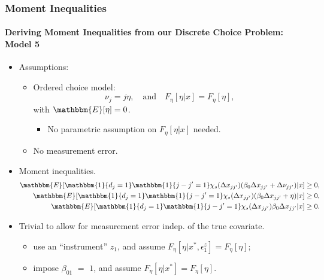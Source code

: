 \documentclass[10pt,letterpaper]{beamer}
\begin{document}
\begin{frame}
\frametitle{Moment Inequalities}
\framesubtitle{Deriving Moment Inequalities from our Discrete Choice Problem: Model 5}

\begin{itemize}
	\item Assumptions:
	\begin{itemize}
		\item Ordered choice model:
		\begin{equation*}
		\nu_{j} = j\eta,\quad\text{and}\quad F_{\eta}[\eta|x]=F_{\eta}[\eta],
		\end{equation*}
		with $\mathbbm{E}[\eta]=0$.
		\begin{itemize}
			\item No parametric assumption on $F_{\eta}[\eta|x]$ needed.
		\end{itemize}
		\item No measurement error.
	\end{itemize}
	\item Moment inequalities.
	\begin{align*}
	\mathbbm{E}[\mathbbm{1}\{d_{j}=1\}\mathbbm{1}\{j-j'=1\}\chi_{s}(\Delta x_{jj'})(\beta_{0}\Delta x_{jj'}+\Delta\nu_{jj'})|x]\geq 0,\\
	\mathbbm{E}[\mathbbm{1}\{d_{j}=1\}\mathbbm{1}\{j-j'=1\}\chi_{s}(\Delta x_{jj'})(\beta_{0}\Delta x_{jj'}+\eta)|x]\geq 0,\\
	\mathbbm{E}[\mathbbm{1}\{d_{j}=1\}\mathbbm{1}\{j-j'=1\}\chi_{s}(\Delta x_{jj'})\beta_{0}\Delta x_{jj'}|x]\geq 0.
	\end{align*}
	\item Trivial to allow for measurement error indep. of the true covariate. 
	\begin{itemize}
		\item use an ``instrument'' $z_{1}$, and assume $F_{\eta}[\eta|x^{*},\epsilon^{z}_{1}]=F_{\eta}[\eta]$;
		\item impose $\beta_{01}$ $=$ $1$, and assume $F_{\eta}[\eta|x^{*}]=F_{\eta}[\eta]$.
	\end{itemize}
\end{itemize}
\end{frame}
\end{document}

